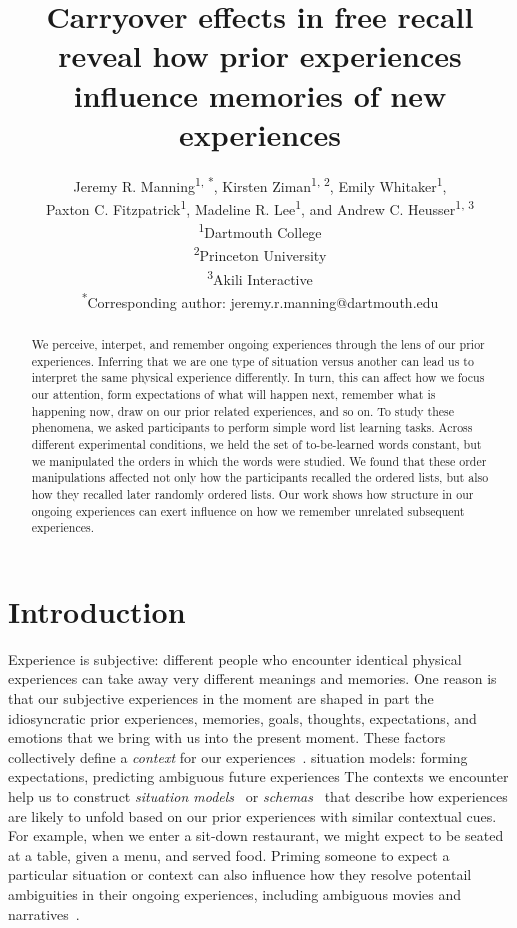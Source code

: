 \documentclass[11pt]{article}
\title{Carryover effects in free recall reveal how prior experiences influence memories of new experiences}
\author{Jeremy R. Manning\textsuperscript{1, *}, Kirsten Ziman\textsuperscript{1, 2}, Emily Whitaker\textsuperscript{1},\\Paxton C. Fitzpatrick\textsuperscript{1}, Madeline R. Lee\textsuperscript{1}, and Andrew C. Heusser\textsuperscript{1, 3}\\\textsuperscript{1}Dartmouth College\\\textsuperscript{2}Princeton University\\\textsuperscript{3}Akili Interactive\\\textsuperscript{*}Corresponding author: jeremy.r.manning@dartmouth.edu}
\date{}
\begin{document}
\maketitle

\begin{abstract} We perceive, interpet, and remember ongoing experiences
through the lens of our prior experiences. Inferring that we are one type of
situation versus another can lead us to interpret the same physical experience
differently. In turn, this can affect how we focus our attention, form
expectations of what will happen next, remember what is happening now, draw on
our prior related experiences, and so on. To study these phenomena, we asked
participants to perform simple word list learning tasks. Across different
experimental conditions, we held the set of to-be-learned words constant, but
we manipulated the orders in which the words were studied. We found that these
order manipulations affected not only how the participants recalled the ordered
lists, but also how they recalled later randomly ordered lists. Our work shows
how structure in our ongoing experiences can exert influence on how we remember
unrelated subsequent experiences. \end{abstract}


\section*{Introduction}


Experience is subjective: different people who encounter identical physical
experiences can take away very different meanings and memories. One reason is
that our subjective experiences in the moment are shaped in part the
idiosyncratic prior experiences, memories, goals, thoughts, expectations, and
emotions that we bring with us into the present moment. These factors
collectively define a \textit{context} for our experiences~\citep{Mann20}. %
situation models: forming expectations, predicting ambiguous future experiences
The contexts we encounter help us to construct \textit{situation
models}~\citep{RangRitc12, MannEtal15} or \textit{schemas}~\citep{MasiEtal22,
BaldEtal18} that describe how experiences are likely to unfold based on our
prior experiences with similar contextual cues. For example, when we enter a
sit-down restaurant, we might expect to be seated at a table, given a menu, and
served food. Priming someone to expect a particular situation or context can
also influence how they resolve potentail ambiguities in their ongoing
experiences, including ambiguous movies and narratives~\citep{YeshEtal17}.
\end{document}
